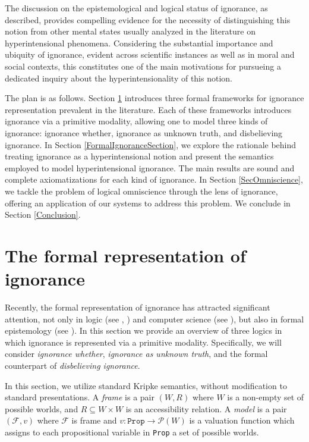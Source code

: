 \documentclass{article}
\begin{document}
The discussion on the epistemological and logical status of ignorance, as described, provides compelling evidence for the necessity of distinguishing this notion from other mental states usually analyzed in the literature on hyperintensional phenomena. Considering the substantial importance and ubiquity of ignorance, evident across scientific instances as well as in moral and social contexts, this constitutes one of the main motivations for  pursueing a dedicated inquiry about the hyperintensionality of this notion. 

The plan is as follows. Section \ref{ReprSec} introduces three formal frameworks for ignorance representation prevalent in the literature. Each of these frameworks introduces ignorance via a primitive modality, allowing one to model three kinds of ignorance: ignorance whether, ignorance as unknown truth, and disbelieving ignorance. In Section \ref{FormalIgnoranceSection}, we explore the rationale behind treating ignorance as a hyperintensional notion and present the semantics employed to model hyperintensional ignorance. The main results are sound and complete axiomatizations for each kind of ignorance. In Section \ref{SecOmniscience},  we tackle the problem of logical omniscience through the lens of ignorance, offering an application of our systems to address this problem. We conclude in Section \ref{Conclusion}.

\section{The formal representation of ignorance}
\label{ReprSec}

Recently, the formal representation of ignorance has attracted significant attention, not only in logic (see \cite{Steinsvold2008}, \cite{Fan2015}) and computer science (see \citet{Hoek2004}), but also in formal epistemology (see \citet{Kubyshkina2021}). In this section we provide an overview of three logics in which ignorance is represented via a primitive modality. Specifically, we will consider \textit{ignorance whether}, \textit{ignorance as unknown truth}, and the formal counterpart of \textit{disbelieving ignorance}. 

In this section, we utilize standard Kripke semantics, without modification to standard presentations. A \textit{frame} is a pair $(W, R)$ where $W$ is a non-empty set of possible worlds, and $R \subseteq W \times W$ is an accessibility relation. A \textit{model} is a pair $(\mathcal{F}, v)$ where $\mathcal{F}$ is frame and $v: \texttt{Prop} \rightarrow \mathcal{P}(W)$ is a valuation function which assigns to each propositional variable in \texttt{Prop} a set of possible worlds.
\end{document}

